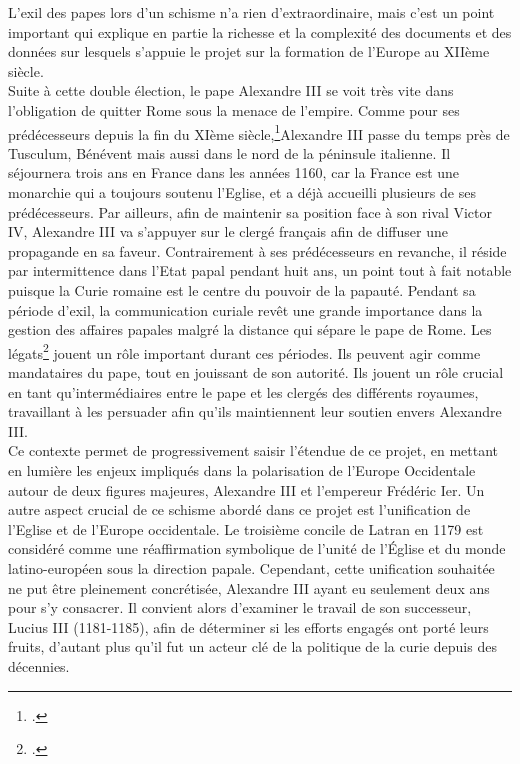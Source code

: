L’exil des papes lors d’un schisme n’a rien d’extraordinaire, mais c’est un point important qui explique en partie la richesse et la complexité des documents et des données sur lesquels s’appuie le projet sur la formation de l’Europe au XIIème siècle. \\
Suite à cette double élection, le pape Alexandre III se voit très vite dans l’obligation de quitter Rome sous la menace de l’empire. Comme pour ses prédécesseurs depuis la fin du XIème siècle,\footcite{grabois_les_1963}Alexandre III passe du temps près de Tusculum, Bénévent mais aussi dans le nord de la péninsule italienne. Il séjournera trois ans en France dans les années 1160, car la France est une monarchie qui a toujours soutenu l’Eglise, et a déjà accueilli plusieurs de ses prédécesseurs. Par ailleurs, afin de maintenir sa position face à son rival Victor IV, Alexandre III va s’appuyer sur le clergé français afin de diffuser une propagande en sa faveur. Contrairement à ses prédécesseurs en revanche, il réside par intermittence dans l’Etat papal pendant huit ans, un point tout à fait notable puisque la Curie romaine est le centre du pouvoir de la papauté.
Pendant sa période d’exil, la communication curiale revêt une grande importance dans la gestion des affaires papales malgré la distance qui sépare le pape de Rome. Les légats\footcite{grabois_les_1963} jouent un rôle important durant ces périodes. Ils peuvent agir comme mandataires du pape, tout en jouissant de son autorité. Ils jouent un rôle crucial en tant qu'intermédiaires entre le pape et les clergés des différents royaumes, travaillant à les persuader afin qu’ils maintiennent leur soutien envers Alexandre III.\\

Ce contexte permet de progressivement saisir l'étendue de ce projet, en mettant en lumière les enjeux impliqués dans la polarisation de l'Europe Occidentale autour de deux figures majeures, Alexandre III et l'empereur Frédéric Ier. Un autre aspect crucial de ce schisme abordé dans ce projet est l’unification de l’Eglise et de l’Europe occidentale. Le troisième concile de Latran en 1179 est considéré comme une réaffirmation symbolique de l'unité de l'Église et du monde latino-européen sous la direction papale. Cependant, cette unification souhaitée ne put être pleinement concrétisée, Alexandre III ayant eu seulement deux ans pour s’y consacrer. Il convient alors d'examiner le travail de son successeur, Lucius III (1181-1185), afin de déterminer si  les efforts engagés ont porté leurs fruits, d'autant plus qu'il fut un acteur clé de la politique de la curie depuis des décennies.


